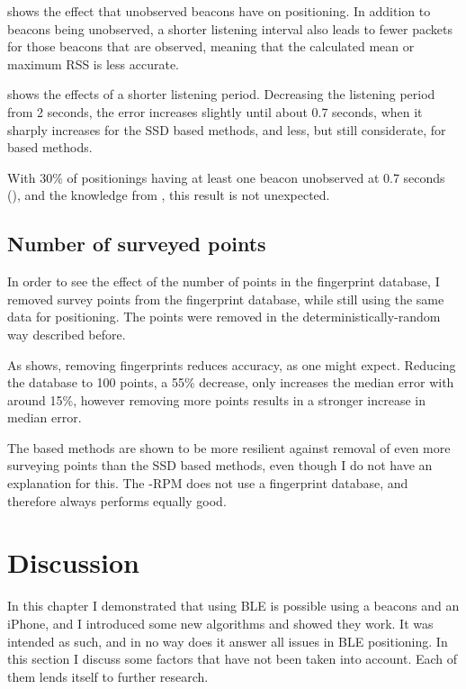  shows the effect that unobserved beacons have on positioning.
In addition to beacons being unobserved, a shorter listening interval also leads to fewer packets for those beacons that are observed, meaning that the calculated mean or maximum RSS is less accurate.

 shows the effects of a shorter listening period.
Decreasing the listening period from 2 seconds, the error increases slightly until about 0.7 seconds, when it sharply increases for the SSD based methods, and less, but still considerate, for \aBRP based methods.

With 30\% of positionings having at least one beacon unobserved at 0.7 seconds (), and the knowledge from , this result is not unexpected.

\subsection{Number of surveyed points}
\label{sec:architecture-number-surveyed-points}
In order to see the effect of the number of points in the fingerprint database, I removed survey points from the fingerprint database, while still using the same data for positioning.
The points were removed in the deterministically-random way described before.

As  shows, removing fingerprints reduces accuracy, as one might expect.
Reducing the database to 100 points, a 55\% decrease, only increases the median error with around 15\%, however removing more points results in a stronger increase in median error.

The \aBRP based methods are shown to be more resilient against removal of even more surveying points than the SSD based methods, even though I do not have an explanation for this.
The \aBRP-RPM does not use a fingerprint database, and therefore always performs equally good.

\section{Discussion}
\label{sec:architecture-discussion}
In this chapter I demonstrated that \ptfp using BLE is possible using a beacons and an iPhone, and I introduced some new algorithms and showed they work.
It was intended as such, and in no way does it answer all issues in BLE positioning.
In this section I discuss some factors that have not been taken into account.
Each of them lends itself to further research.

